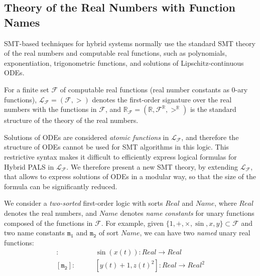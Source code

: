 %


\subsection{Theory of the Real Numbers with Function Names}

SMT-based techniques for hybrid systems
normally use the standard SMT theory of the real numbers and computable %
real functions,
such as polynomials, exponentiation, trigonometric functions,  
and solutions of Lipschitz-continuous ODEs.

\begin{definition}
For a finite set $\mathcal{F}$ of computable real functions
(real number constants as $0$-ary functions),
%
$\mathcal{L}_\mathcal{F} = (\mathcal{F}, >)$ denotes the first-order signature over the real numbers
with the functions in $\mathcal{F}$,
and $\mathbb{R}_\mathcal{F} = (\mathbb{R}, \mathcal{F}^\mathbb{R}, >^\mathbb{R})$
is the standard structure of the theory of the real numbers.
\end{definition}


Solutions of ODEs are considered  \emph{atomic functions} in $\mathcal{L}_\mathcal{F}$,
and therefore the structure of ODEs cannot be used for SMT algorithms  in this logic.
This restrictive syntax makes it difficult to efficiently express logical formulas for Hybrid PALS 
in $\mathcal{L}_\mathcal{F}$. 
We therefore present a new SMT theory,
by extending $\mathcal{L}_\mathcal{F}$, that allows to express solutions of ODEs in a modular way,
so that the size of the formula can be significantly reduced.


We consider a \emph{two-sorted} first-order logic with sorts $\mathit{Real}$ and $\mathit{Name}$,
where $\mathit{Real}$ denotes the real numbers,
and $\mathit{Name}$ denotes \emph{name constants} 
for unary functions composed of the functions in $\mathcal{F}$.
For example, given $\{1, +, \times, \sin, x, y\} \subset \mathcal{F}$
and two name constants $\mathtt{m_1}$ and $\mathtt{m_2}$ of sort $\mathit{Name}$,
we can have two \emph{named} unary real functions:
\begin{align*}
[\mathtt{m_1}]:\qquad&
\sin(x(t)) :\mathit{Real} \to \mathit{Real}
\\
[\mathtt{m_2}]:\qquad&
[y(t) + 1, z(t)^2] :  \mathit{Real} \to \mathit{Real}^2
\end{align*}


